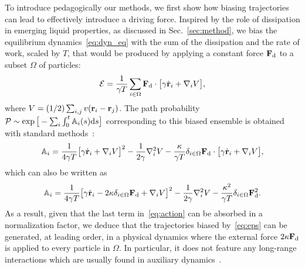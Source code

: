 \documentclass[superscriptaddress, twocolumn, prx, longbibliography, nofootinbib]{revtex4-1}
\begin{document}
To introduce pedagogically our methods, we first show how biasing trajectories can lead to effectively introduce a driving force. Inspired by the role of dissipation in emerging liquid properties, as discussed in Sec.~\ref{sec:method}, we bias the equilibrium dynamics~\eqref{eq:dyn_eq} with the sum of the dissipation and the rate of work, scaled by $T$, that would be produced by applying a constant force ${\bf F}_{\rm d}$ to a subset $\Omega$ of particles:
\begin{equation}\label{eq:eps}
	{\cal E} = \frac{1}{\gamma T}\sum_{i\in\Omega} {\bf F}_{\rm d}\cdot\big[ \gamma\dot{\bf r}_i + \nabla_i V \big] ,
\end{equation}
where $V=(1/2)\sum_{i,j}v({\bf r}_i-{\bf r}_j)$. The path probability ${\cal P}\sim\exp\big[-\sum_i\int_0^t{\mathbb A}_i(s){\rm d}s\big]$ corresponding to this biased ensemble is obtained with standard methods~\cite{Martin1973, Dominicis1975}:
\begin{equation}\label{eq:action_exp}
	{\mathbb A}_i = \frac{1}{4\gamma T} \big[\gamma\dot{\bf r}_i + \nabla_iV\big]^2 - \frac{1}{2\gamma} \nabla^2_iV - \frac{\kappa}{\gamma T} \delta_{i\in\Omega} {\bf F}_{\rm d} \cdot\big[ \gamma\dot{\bf r}_i + \nabla_i V \big] ,
\end{equation}
which can also be written as
\begin{equation}\label{eq:action}
	{\mathbb A}_i = \frac{1}{4\gamma T} \big[\gamma\dot{\bf r}_i - 2\kappa\delta_{i\in\Omega}{\bf F}_{\rm d} + \nabla_iV\big]^2 - \frac{1}{2\gamma} \nabla^2_iV - \frac{\kappa^2}{\gamma T}\delta_{i\in\Omega}{\bf F}_{\rm d}^2 .
\end{equation}
As a result, given that the last term in~\eqref{eq:action} can be absorbed in a normalization factor, we deduce that the trajectories biased by~\eqref{eq:eps} can be generated, at leading order, in a physical dynamics where the external force $2\kappa{\bf F}_{\rm d}$ is applied to every particle in $\Omega$. In particular, it does not feature any long-range interactions which are usually found in auxiliary dynamics~\cite{Jack2015}.
\end{document}
